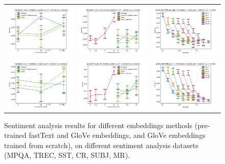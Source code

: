 \begin{figure}
\begin{tabular} {c c c}
	\includegraphics[width=0.28\linewidth]{figures/fasttext1m_subj_test-err_vs_compression.pdf} &
	\includegraphics[width=0.28\linewidth]{figures/glove400k_subj_test-err_vs_compression.pdf} &
	\includegraphics[width=0.28\linewidth]{figures/glove-wiki400k-am_subj_test-err_vs_compression.pdf} \\[-0.5em]
	\includegraphics[width=0.28\linewidth]{figures/fasttext1m_mr_test-err_vs_compression.pdf} &
	\includegraphics[width=0.28\linewidth]{figures/glove400k_mr_test-err_vs_compression.pdf} &
	\includegraphics[width=0.28\linewidth]{figures/glove-wiki400k-am_mr_test-err_vs_compression.pdf} \\[-0.5em]
	\end{tabular}
	\caption{
		Sentiment analysis results for different embeddings methods (pre-trained fastText and GloVe embeddings, and GloVe embeddings trained from scratch), on different sentiment analysis datasets (MPQA, TREC, SST, CR, SUBJ, MR).
	}
	\label{fig:all_sentiment}
\end{figure}